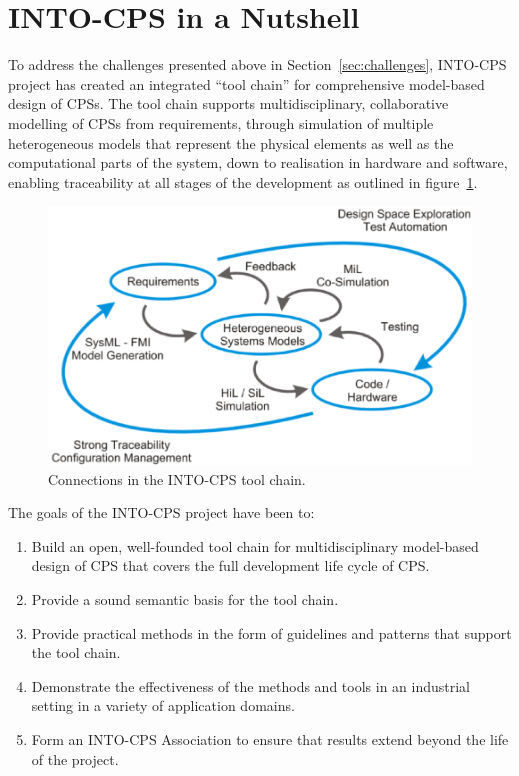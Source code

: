 \section{INTO-CPS in a Nutshell}\label{sec:nutshell}



To address the challenges presented above in Section~\ref{sec:challenges}, INTO-CPS project has created an integrated ``tool chain'' for comprehensive model-based design of CPSs. The tool chain supports multidisciplinary, collaborative modelling of CPSs from requirements, through simulation of multiple heterogeneous models that represent the physical elements as well as the computational parts of the system, down to realisation in hardware and software, enabling traceability at all stages of the development as outlined in figure~\ref{fig:intooverview}.

\begin{figure}[ht]
\centering
\includegraphics[width=\textwidth]{./figures/INTOoverview}
\caption{Connections in the INTO-CPS tool chain.}
\label{fig:intooverview}
\end{figure}

The goals of the INTO-CPS project have been to:
\begin{enumerate}
\item Build an open, well-founded tool chain for multidisciplinary model-based design of CPS that covers the full development life cycle of CPS.
\item Provide a sound semantic basis for the tool chain.
\item Provide practical methods in the form of guidelines and patterns that support the tool chain.
\item Demonstrate the effectiveness of the methods and tools in an industrial setting in a variety of application domains.
\item Form an INTO-CPS Association to ensure that results extend beyond the life of the project.
\end{enumerate}

